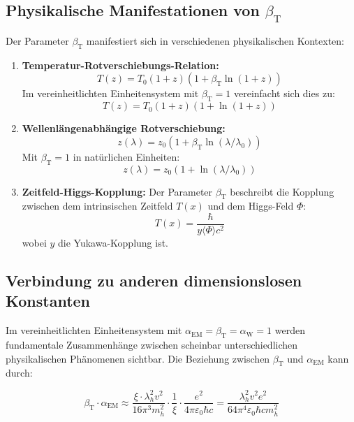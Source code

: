 \documentclass[12pt,a4paper]{article}
\newcommand{\Tfield}{T(x)}
\newcommand{\betaT}{\beta_{\text{T}}}
\newcommand{\alphaEM}{\alpha_{\text{EM}}}
\newcommand{\alphaW}{\alpha_{\text{W}}}
\begin{document}
	\subsection{Physikalische Manifestationen von \(\betaT\)}
	
	Der Parameter \(\betaT\) manifestiert sich in verschiedenen physikalischen Kontexten:
	
	\begin{enumerate}
		\item \textbf{Temperatur-Rotverschiebungs-Relation:} 
		\begin{equation}
			T(z) = T_0 (1 + z) (1 + \betaT \ln(1 + z))
		\end{equation}
		Im vereinheitlichten Einheitensystem mit \(\betaT = 1\) vereinfacht sich dies zu:
		\begin{equation}
			T(z) = T_0 (1 + z) (1 + \ln(1 + z))
		\end{equation}
		\item \textbf{Wellenlängenabhängige Rotverschiebung:} 
		\begin{equation}
			z(\lambda) = z_0 (1 + \betaT \ln(\lambda/\lambda_0))
		\end{equation}
		Mit \(\betaT = 1\) in natürlichen Einheiten:
		\begin{equation}
			z(\lambda) = z_0 (1 + \ln(\lambda/\lambda_0))
		\end{equation}
		\item \textbf{Zeitfeld-Higgs-Kopplung:} Der Parameter \(\betaT\) beschreibt die Kopplung zwischen dem intrinsischen Zeitfeld \(\Tfield\) und dem Higgs-Feld \(\Phi\):
		\begin{equation}
			\Tfield = \frac{\hbar}{y \langle \Phi \rangle c^2}
		\end{equation}
		wobei \(y\) die Yukawa-Kopplung ist.
	\end{enumerate}
	
	\subsection{Verbindung zu anderen dimensionslosen Konstanten}
	
	Im vereinheitlichten Einheitensystem mit \(\alphaEM = \betaT = \alphaW = 1\) werden fundamentale Zusammenhänge zwischen scheinbar unterschiedlichen physikalischen Phänomenen sichtbar. Die Beziehung zwischen \(\betaT\) und \(\alphaEM\) kann durch:
	
	\begin{equation}
		\betaT \cdot \alphaEM \approx \frac{\xi \cdot \lambda_h^2 v^2}{16\pi^3 m_h^2} \cdot \frac{1}{\xi} \cdot \frac{e^2}{4\pi\varepsilon_0\hbar c} = \frac{\lambda_h^2 v^2 e^2}{64\pi^4\varepsilon_0\hbar c m_h^2}
	\end{equation}
	
\end{document}
